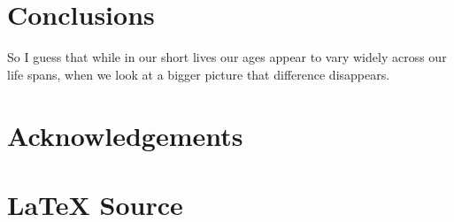 \documentclass[11pt, oneside]{article}          %
\theoremstyle{definition}
\begin{document}
\section{Conclusions}
So I guess that while in our short lives our ages appear to vary widely
across our life spans, when we look at a bigger picture that difference
disappears.
%
%
%
\section*{Acknowledgements}
%                                                                                                                                          
%                                                                                                                                          
\section*{\LaTeX \hspace{0.10 mm} Source}
%                                                                                                                                          
%                                                                                                                                          
%                                                                                                                                          


%                                                                                                                                          
%                                                                                                                                          
\end{document}
